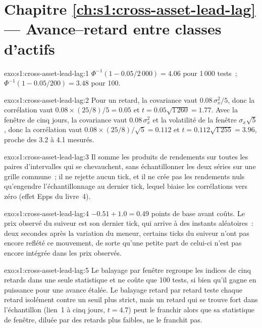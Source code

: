 \section*{Chapitre \ref{ch:s1:cross-asset-lead-lag} --- Avance–retard entre classes d'actifs}

\begin{solution}{exo:s1:cross-asset-lead-lag:1}
$\Phi^{-1}(1 - 0.05/2\,000) = 4.06$ pour 1\,000 tests~; $\Phi^{-1}(1 - 0.05/200) = 3.48$ pour 100.
\end{solution}

\begin{solution}{exo:s1:cross-asset-lead-lag:2}
Pour un retard, la covariance vaut $0.08\,\sigma_x^2/5$, donc la corrélation vaut $0.08 \times (25/8)/5 = 0.05$ et $t = 0.05\sqrt{1\,260} = 1.77$. Avec la
fenêtre de cinq jours, la covariance vaut $0.08\,\sigma_x^2$ et la volatilité de la fenêtre $\sigma_x\sqrt5$, donc la corrélation vaut $0.08 \times (25/8)/\sqrt5 = 0.112$
et $t = 0.112\sqrt{1\,255} = 3.96$, proche des 3.2 à 4.1 mesurés.
\end{solution}

\begin{solution}{exo:s1:cross-asset-lead-lag:3}
Il somme les produits de rendements sur toutes les paires d'intervalles qui se chevauchent, sans échantillonner les deux séries sur une grille commune~; il ne rejette aucun tick, et il ne
crée pas les rendements nuls qu'engendre l'échantillonnage au dernier tick, lequel biaise les corrélations vers zéro (effet Epps du livre~4).
\end{solution}

\begin{solution}{exo:s1:cross-asset-lead-lag:4}
$-0.51 + 1.0 = 0.49$ points de base avant coûts. Le prix observé du suiveur est son dernier tick, qui arrive à des instants aléatoires~: deux secondes après la
variation du meneur, certains ticks du suiveur n'ont pas encore reflété ce mouvement, de sorte qu'une petite part de celui-ci n'est pas encore intégrée dans les prix observés.
\end{solution}

\begin{solution}{exo:s1:cross-asset-lead-lag:5}
Le balayage par fenêtre regroupe les indices de cinq retards dans une seule statistique et ne coûte que 100 tests, si bien qu'il gagne en puissance pour une avance étalée. Le balayage retard par retard
teste chaque retard isolément contre un seuil plus strict, mais un retard qui se trouve fort dans l'échantillon (lien~1 à cinq jours, $t = 4.7$) peut le franchir
alors que sa statistique de fenêtre, diluée par des retards plus faibles, ne le franchit pas.
\end{solution}

